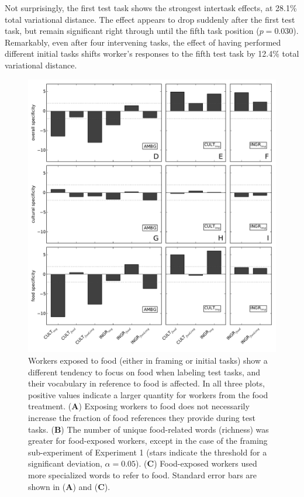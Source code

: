 \documentclass{sigchi}
\begin{document}
Not surprisingly, the first test task shows the strongest intertask 
effects, at 28.1\% total variational distance.  The effect appears to 
drop suddenly after the first test task, but remain significant 
right through until the fifth task position ($p=0.030$).
Remarkably, even after four intervening tasks, the effect of 
having performed different initial tasks shifts worker's responses to the
fifth test task by 12.4\% total variational distance.

\begin{figure}
	\centering
	\includegraphics[scale=1.05]{figs/specificity.pdf}
	\caption{
		Workers exposed to food (either in framing or initial tasks)
		show a different tendency to focus on food when labeling
		test tasks, and their vocabulary in reference to food is affected.
		In all three plots, positive values indicate a larger quantity for 
		workers from the food treatment.
		(\textbf{A}) Exposing workers to food does not necessarily increase
		the fraction of food references they provide during test tasks.
		(\textbf{B}) The number of unique food-related
		words (richness) was greater for food-exposed workers, 
		except in the 
		case of the framing sub-experiment of Experiment 1 
		(stars indicate the threshold
		for a significant deviation, $\alpha=0.05$). 
		(\textbf{C}) Food-exposed
		workers used more specialized words to refer to food.
		Standard error bars are shown in (\textbf{A}) and (\textbf{C}).
	}
	\label{fig:specificity}
\end{figure}
\end{document}
